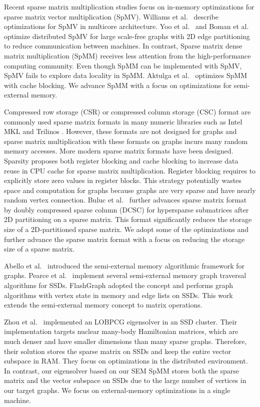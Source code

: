 Recent sparse matrix multiplication studies focus on in-memory optimizations
for sparse matrix vector multiplication (SpMV). Williams et al.~\cite{Williams07}
describe optimizations for SpMV in multicore architecture. Yoo et al.~\cite{Yoo11}
and Boman et al.~\cite{Boman2013} optimize distributed SpMV for large
scale-free graphs with 2D edge partitioning to reduce communication between
machines. In contrast, Sparse matrix dense matrix multiplication (SpMM) receives
less attention from the high-performance computing community. Even though
SpMM can be implemented with SpMV, SpMV fails to explore data locality in SpMM.
Aktulga et al.~\cite{Aktulga14} optimizes SpMM with cache blocking. We advance
SpMM with a focus on optimizations for semi-external memory.

Compressed row storage (CSR) or compressed column storage (CSC) format are commonly
used sparse matrix formats in many numeric libraries such as Intel MKL \cite{mkl}
and Trilinos \cite{trilinos}. However, these formats are not designed for graphs
and sparse matrix multiplication with these formats on graphs incurs many random
memory accesses.
More modern sparse matrix formats have been designed.
Sparsity \cite{Im04} proposes both register blocking and cache blocking to
increase data reuse in CPU cache for sparse matrix multiplication. Register blocking
requires to explicitly store zero values in register blocks. This strategy
potentially wastes space and computation for graphs because graphs are very
sparse and have nearly random vertex connection. Buluc et al.~\cite{Buluc08}
further advances sparse matrix format
by doubly compressed sparse column (DCSC) for hypersparse submatrices after 2D
partitioning on a sparse matrix. This format significantly reduces the storage
size of a 2D-partitioned sparse matrix. We adopt some of the optimizations
and further advance the sparse matrix
format with a focus on reducing the storage size of a sparse matrix.

Abello et al.~\cite{Abello98} introduced the semi-external memory algorithmic
framework for graphs. Pearce et al.~\cite{Pearce10} implement several 
semi-external memory graph traversal algorithms for SSDs. FlashGraph
\cite{flashgraph} adopted the concept and performs graph algorithms with
vertex state in memory and edge lists on SSDs. This work extends the semi-external
memory concept to matrix operations.

Zhou et al.~\cite{Zhou12} implemented an LOBPCG \cite{Arbenz05} eigensolver in
an SSD cluster. Their implementation targets nuclear many-body Hamiltonian
matrices, which are much denser and have smaller dimensions than many sparse
graphs. Therefore, their solution stores the sparse matrix on SSDs and keep
the entire vector subspace in RAM. They focus on optimizations
in the distributed environment. In contrast, our eigensolver based on our
SEM SpMM stores both
the sparse matrix and the vector subspace on SSDs due to the large number
of vertices in our target graphs. We focus on external-memory optimizations
in a single machine.

